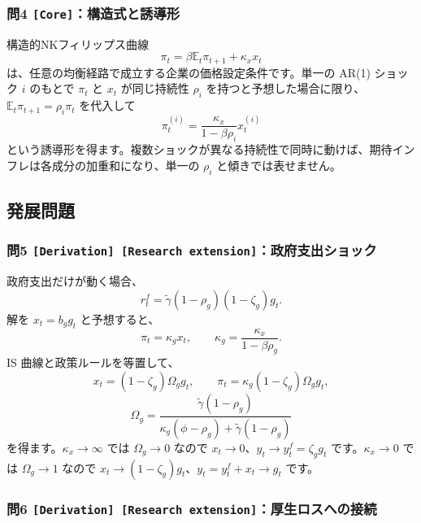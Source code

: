 \documentclass[
  japanese,
  lualatex,
  ja=standard,
  11pt,
  a4paper]{ltjsarticle}
\begin{document}
\subsubsection{\texorpdfstring{問4
\texttt{{[}Core{]}}：構造式と誘導形}{問4 {[}Core{]}：構造式と誘導形}}\label{ux554f4-coreux69cbux9020ux5f0fux3068ux8a98ux5c0eux5f62}

構造的NKフィリップス曲線 \[
\pi_t=\beta\mathbb E_t\pi_{t+1}+\kappa_xx_t
\] は、任意の均衡経路で成立する企業の価格設定条件です。単一の AR(1)
ショック \(i\) のもとで \(\pi_t\) と \(x_t\) が同じ持続性 \(\rho_i\)
を持つと予想した場合に限り、\(\mathbb E_t\pi_{t+1}=\rho_i\pi_t\)
を代入して \[
\pi_t^{(i)}=\frac{\kappa_x}{1-\beta\rho_i}x_t^{(i)}
\]
という誘導形を得ます。複数ショックが異なる持続性で同時に動けば、期待インフレは各成分の加重和になり、単一の
\(\rho_i\) と傾きでは表せません。

\subsection{発展問題}\label{ux767aux5c55ux554fux984c-7}

\subsubsection{\texorpdfstring{問5
\texttt{{[}Derivation{]}\ {[}Research\ extension{]}}：政府支出ショック}{問5 {[}Derivation{]} {[}Research extension{]}：政府支出ショック}}\label{ux554f5-derivation-research-extensionux653fux5e9cux652fux51faux30b7ux30e7ux30c3ux30af}

政府支出だけが動く場合、 \[
r_t^f=\widetilde\gamma(1-\rho_g)(1-\zeta_g)g_t.
\] 解を \(x_t=b_gg_t\) と予想すると、 \[
\pi_t=\kappa_gx_t,
\qquad
\kappa_g=\frac{\kappa_x}{1-\beta\rho_g}.
\] IS 曲線と政策ルールを等置して、 \[
x_t=(1-\zeta_g)\Omega_gg_t,
\qquad
\pi_t=\kappa_g(1-\zeta_g)\Omega_gg_t,
\] \[
\Omega_g
=\frac{\widetilde\gamma(1-\rho_g)}
{\kappa_g(\phi-\rho_g)+\widetilde\gamma(1-\rho_g)}
\] を得ます。\(\kappa_x\to\infty\) では \(\Omega_g\to0\) なので
\(x_t\to0\)、\(y_t\to y_t^f=\zeta_gg_t\) です。\(\kappa_x\to0\) では
\(\Omega_g\to1\) なので
\(x_t\to(1-\zeta_g)g_t\)、\(y_t=y_t^f+x_t\to g_t\) です。


\subsubsection{\texorpdfstring{問6
\texttt{{[}Derivation{]}\ {[}Research\ extension{]}}：厚生ロスへの接続}{問6 {[}Derivation{]} {[}Research extension{]}：厚生ロスへの接続}}\label{ux554f6-derivation-research-extensionux539aux751fux30edux30b9ux3078ux306eux63a5ux7d9a}
\end{document}
